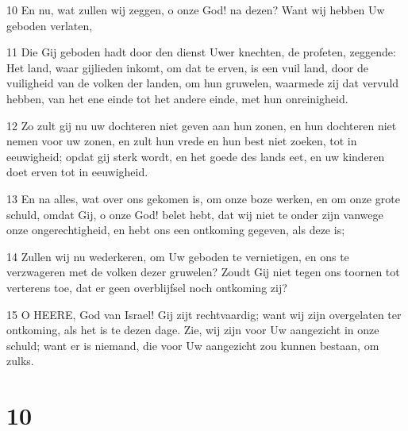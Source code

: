 \par 10 En nu, wat zullen wij zeggen, o onze God! na dezen? Want wij hebben Uw geboden verlaten,
\par 11 Die Gij geboden hadt door den dienst Uwer knechten, de profeten, zeggende: Het land, waar gijlieden inkomt, om dat te erven, is een vuil land, door de vuiligheid van de volken der landen, om hun gruwelen, waarmede zij dat vervuld hebben, van het ene einde tot het andere einde, met hun onreinigheid.
\par 12 Zo zult gij nu uw dochteren niet geven aan hun zonen, en hun dochteren niet nemen voor uw zonen, en zult hun vrede en hun best niet zoeken, tot in eeuwigheid; opdat gij sterk wordt, en het goede des lands eet, en uw kinderen doet erven tot in eeuwigheid.
\par 13 En na alles, wat over ons gekomen is, om onze boze werken, en om onze grote schuld, omdat Gij, o onze God! belet hebt, dat wij niet te onder zijn vanwege onze ongerechtigheid, en hebt ons een ontkoming gegeven, als deze is;
\par 14 Zullen wij nu wederkeren, om Uw geboden te vernietigen, en ons te verzwageren met de volken dezer gruwelen? Zoudt Gij niet tegen ons toornen tot verterens toe, dat er geen overblijfsel noch ontkoming zij?
\par 15 O HEERE, God van Israel! Gij zijt rechtvaardig; want wij zijn overgelaten ter ontkoming, als het is te dezen dage. Zie, wij zijn voor Uw aangezicht in onze schuld; want er is niemand, die voor Uw aangezicht zou kunnen bestaan, om zulks.

\chapter{10}

